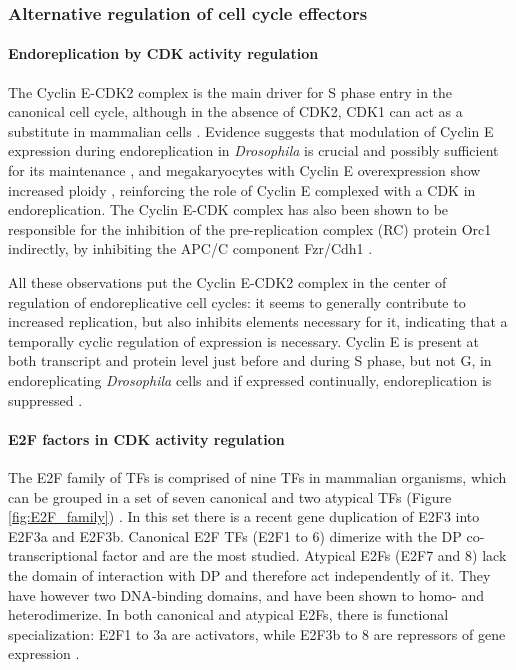 \documentclass[11pt,twoside,a4paper]{report}
\begin{document}
			\subsubsection{Alternative regulation of cell cycle effectors}
			
				\paragraph{Endoreplication by CDK activity regulation}
				
				The Cyclin E-CDK2 complex is the main driver for S phase entry in the canonical cell cycle, although in the absence of CDK2, CDK1 can act as a substitute in mammalian cells \cite{Ullah2009}. Evidence suggests that modulation of Cyclin E expression during endoreplication in \textit{Drosophila} is crucial and possibly sufficient for its maintenance \cite{Lilly2005}, and megakaryocytes with Cyclin E overexpression show increased ploidy \cite{Eliades2010}, reinforcing the role of Cyclin E complexed with a CDK in endoreplication. The Cyclin E-CDK complex has also been shown to be responsible for the inhibition of the pre-replication complex (RC) protein Orc1 indirectly, by inhibiting the APC/C component Fzr/Cdh1 \cite{Narbonne-Reveau2008}.
			
				All these observations put the Cyclin E-CDK2 complex in the center of regulation of endoreplicative cell cycles: it seems to generally contribute to increased replication, but also inhibits elements necessary for it, indicating that a temporally cyclic regulation of expression is necessary. Cyclin E is present at both transcript and protein level just before and during S phase, but not G, in endoreplicating \textit{Drosophila} cells \cite{Weng2003} and if expressed continually, endoreplication is suppressed \cite{Weiss}.
			
				\paragraph{E2F factors in CDK activity regulation}
				\label{paragraph:E2Fs}
				The E2F family of TFs is comprised of nine TFs in mammalian organisms, which can be grouped in a set of seven canonical and two atypical TFs (Figure \ref{fig:E2F_family})  \cite{VandenHeuvel2008}. In this set there is a recent gene duplication of E2F3 into E2F3a and E2F3b. Canonical E2F TFs (E2F1 to 6) dimerize with the DP co-transcriptional factor and are the most studied. Atypical E2Fs (E2F7 and 8) lack the domain of interaction with DP and therefore act independently of it. They have however two DNA-binding domains, and have been shown to homo- and heterodimerize. In both canonical and atypical E2Fs, there is functional specialization: E2F1 to 3a are activators, while E2F3b to 8 are repressors of gene expression  \cite{VandenHeuvel2008}.
				
\end{document}
